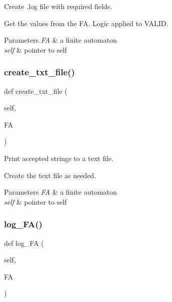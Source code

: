 Create .log file with required fields. 

Get the values from the FA. Logic applied to V\+A\+L\+ID. 
\begin{DoxyParams}{Parameters}
{\em FA} & a finite automaton \\
\hline
{\em self} & pointer to self \\
\hline
\end{DoxyParams}
\mbox{\label{classfa__logger_1_1_f_a___logger_a2b8f832136f088b2c9cbb581e269736d}} 
\subsubsection{\texorpdfstring{create\+\_\+txt\+\_\+file()}{create\_txt\_file()}}
{\footnotesize\ttfamily def create\+\_\+txt\+\_\+file (\begin{DoxyParamCaption}\item[{}]{self,  }\item[{}]{FA }\end{DoxyParamCaption})}



Print accepted strings to a text file. 

Create the text file as needed. 
\begin{DoxyParams}{Parameters}
{\em FA} & a finite automaton \\
\hline
{\em self} & pointer to self \\
\hline
\end{DoxyParams}
\mbox{\label{classfa__logger_1_1_f_a___logger_a1a28f2676eeb8c10690675c7595c4841}} 
\subsubsection{\texorpdfstring{log\+\_\+\+F\+A()}{log\_FA()}}
{\footnotesize\ttfamily def log\+\_\+\+FA (\begin{DoxyParamCaption}\item[{}]{self,  }\item[{}]{FA }\end{DoxyParamCaption})}



